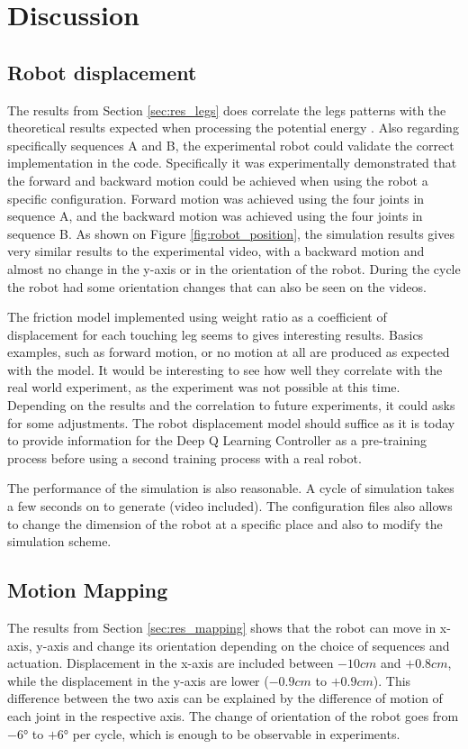 \chapter{Discussion}
    \section{Robot displacement}
        The results from Section \ref{sec:res_legs} does correlate the legs patterns with the theoretical results expected when processing the potential energy \cite{mo_main_paper}. Also regarding specifically sequences A and B, the experimental robot could validate the correct implementation in the code. Specifically it was experimentally demonstrated that the forward and backward motion could be achieved when using the robot a specific configuration. Forward motion was achieved using the four joints in sequence A, and the backward motion was achieved using the four joints in sequence B. As shown on Figure \ref{fig:robot_position}, the simulation results gives very similar results to the experimental video, with a backward motion and almost no change in the y-axis or in the orientation of the robot. During the cycle the robot had some orientation changes that can also be seen on the videos.
        
        The friction model implemented using weight ratio as a coefficient of displacement for each touching leg seems to gives interesting results. Basics examples, such as forward motion, or no motion at all are produced as expected with the model. It would be interesting to see how well they correlate with the real world experiment, as the experiment was not possible at this time. Depending on the results and the correlation to future experiments, it could asks for some adjustments. The robot displacement model should suffice as it is today to provide information for the Deep Q Learning Controller as a pre-training process before using a second training process with a real robot.
        
        The performance of the simulation is also reasonable. A cycle of simulation takes a few seconds on to generate (video included). The configuration files also allows to change the dimension of the robot at a specific place and also to modify the simulation scheme.
    \section{Motion Mapping}
        The results from Section \ref{sec:res_mapping} shows that the robot can move in x-axis, y-axis and change its orientation depending on the choice of sequences and actuation. Displacement in the x-axis are included between $-10cm$ and $+0.8cm$, while the displacement in the y-axis are lower ($-0.9cm$ to $+0.9cm$). This difference between the two axis can be explained by the difference of motion of each joint in the respective axis. The change of orientation of the robot goes from $-6$° to $+6$° per cycle, which is enough to be observable in experiments. 
        
